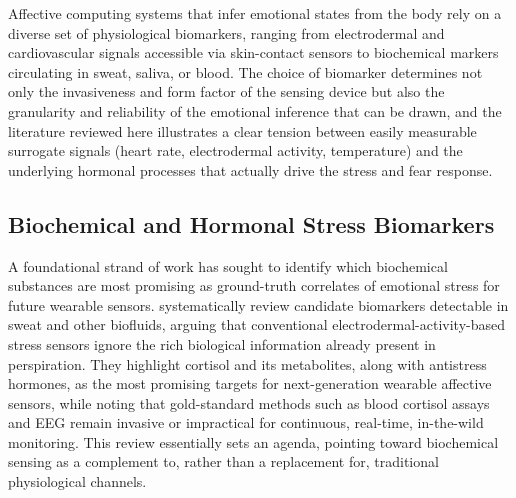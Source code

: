 Affective computing systems that infer emotional states from the body rely on a diverse set of physiological biomarkers, ranging from electrodermal and cardiovascular signals accessible via skin-contact sensors to biochemical markers circulating in sweat, saliva, or blood. The choice of biomarker determines not only the invasiveness and form factor of the sensing device but also the granularity and reliability of the emotional inference that can be drawn, and the literature reviewed here illustrates a clear tension between easily measurable surrogate signals (heart rate, electrodermal activity, temperature) and the underlying hormonal processes that actually drive the stress and fear response.

\subsection{Biochemical and Hormonal Stress Biomarkers}
A foundational strand of work has sought to identify which biochemical substances are most promising as ground-truth correlates of emotional stress for future wearable sensors. \cite{zamkah2020identification} systematically review candidate biomarkers detectable in sweat and other biofluids, arguing that conventional electrodermal-activity-based stress sensors ignore the rich biological information already present in perspiration. They highlight cortisol and its metabolites, along with antistress hormones, as the most promising targets for next-generation wearable affective sensors, while noting that gold-standard methods such as blood cortisol assays and EEG remain invasive or impractical for continuous, real-time, in-the-wild monitoring. This review essentially sets an agenda, pointing toward biochemical sensing as a complement to, rather than a replacement for, traditional physiological channels.

